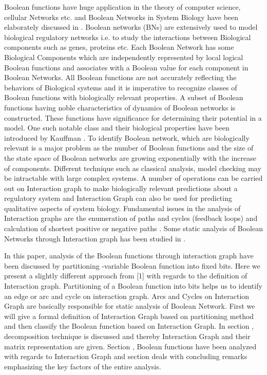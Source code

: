 \documentclass{article}
\begin{document}
Boolean functions have huge application in the theory of computer science, cellular Networks etc.  and Boolean Networks in System Biology have been elaborately discussed in . Boolean networks (BNs) are extensively used to model biological regulatory networks  i.e. to study the interactions between Biological components such as genes, proteins etc. Each Boolean Network has some Biological Components which are independently represented by local logical Boolean functions and associates with a Boolean value for each component in Boolean Networks. All Boolean functions are not accurately reflecting the behaviors of Biological systems and it is imperative to recognize classes of Boolean functions with biologically relevant properties. A subset of Boolean functions having noble characteristics of dynamics of Boolean networks is constructed. These functions have significance for determining their potential in a model. One such notable class and their biological properties have been introduced by Kauffman . To identify Boolean network, which are biologically relevant is a major problem as the number of Boolean functions and the size of the state space of Boolean networks are growing exponentially  with the increase of components. Different technique such as classical analysis, model checking may be intractable with large complex systems. A number of operations can be carried out on Interaction graph to make biologically relevant predictions about a regulatory system and Interaction Graph can also be used for predicting qualitative aspects of system biology. Fundamental issues in the analysis of Interaction graphs are the enumeration of paths and cycles (feedback loops) and calculation of shortest positive or negative paths .  Some static analysis of Boolean Networks through Interaction graph has been studied in .

In this paper, analysis of the Boolean functions through interaction graph have been discussed by partitioning -variable Boolean function into  fixed bits. Here we present a slightly different approach from [1] with regards to the definition of Interaction graph.  Partitioning of a Boolean function into  bits helps us to identify an edge or arc and cycle on interaction graph. Arcs and Cycles on Interaction Graph are basically responsible for static analysis of Boolean Network. First we will give a formal definition of Interaction Graph based on partitioning method and then classify the Boolean function based on Interaction Graph. In section , decomposition technique is discussed and thereby Interaction Graph and their matrix representation are given. Section , Boolean functions have been analyzed with regards to Interaction Graph and section  deals with concluding remarks emphasizing the key factors of the entire analysis.
\end{document}
